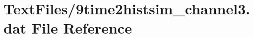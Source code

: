 \hypertarget{9time2histsim__channel3_8dat}{}\section{Text\+Files/9time2histsim\+\_\+channel3.dat File Reference}
\label{9time2histsim__channel3_8dat}
